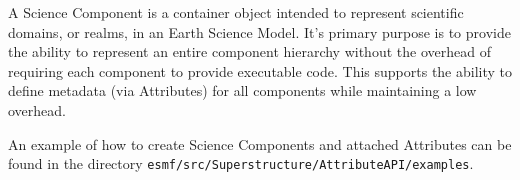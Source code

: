%


A Science Component is a container object intended to represent scientific
domains, or realms, in an Earth Science Model.  It's primary purpose is to 
provide the ability to represent an entire component hierarchy without the
overhead of requiring each component to provide executable code.  This 
supports the ability to define metadata (via Attributes) for all components 
while maintaining a low overhead.

An example of how to create Science Components and attached Attributes can
be found in the directory {\tt esmf/src/Superstructure/AttributeAPI/examples}.



